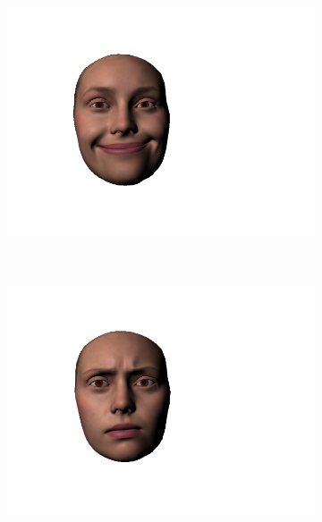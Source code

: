 \documentclass[11pt]{report}
\begin{document}
\begin{figure}[htbp!]
        \centering
        \begin{subfigure}[b]{0.23\textwidth}
                \includegraphics[trim = 50mm 30mm 80mm 30mm,clip,width=\textwidth]{img/weights/3D/Extrafaces/lipcorners15.png}
        \end{subfigure}
        ~ %
        \begin{subfigure}[b]{0.23\textwidth}
                \includegraphics[trim = 50mm 30mm 80mm 30mm,clip,width=\textwidth]{img/weights/3D/Extrafaces/eyebrowsin2.png}
        \end{subfigure} 

\end{figure}
\end{document}
